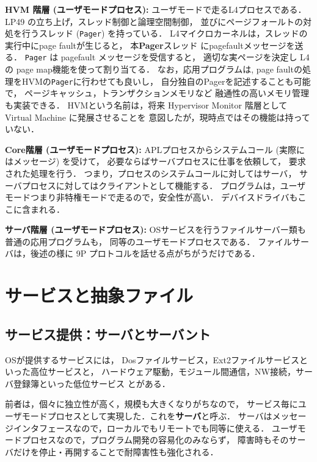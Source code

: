 \documentclass{ieicej}
\begin{document}
{\bf HVM 階層 (ユーザモードプロセス): }
     ユーザモードで走るL4プロセスである．
     LP49 の立ち上げ，スレッド制御と論理空間制御，
    並びにページフォールトの対処を行うスレッド ({\tt Pager}) を持っている．
%
    L4マイクロカーネルは，スレッドの実行中にpage faultが生じると，
    本{\bf Pager}スレッド にpagefaultメッセージを送る．
   {\tt Pager} は pagefault メッセージを受信すると，
   適切な実ページを決定し L4の page map機能を使って割り当てる．
   なお，応用プログラムは, page faultの処理をHVMの{\tt Pager}に行わせても良いし，
   自分独自のPagerを記述することも可能で，
   ページキャッシュ，トランザクションメモリなど
   融通性の高いメモリ管理も実装できる．
%
    HVMという名前は，将来 Hypervisor Monitor 階層として Virtual Machine に発展させることを
    意図したが，現時点ではその機能は持っていない．

    
{\bf Core階層  (ユーザモードプロセス): }
     APLプロセスからシステムコール (実際にはメッセージ) を受けて，
    必要ならばサーバプロセスに仕事を依頼して，
    要求された処理を行う．
   つまり，プロセスのシステムコールに対してはサーバ，
   サーバプロセスに対してはクライアントとして機能する．
%   
    プログラムは，ユーザモードつまり非特権モードで走るので，安全性が高い．
    デバイスドライバもここに含まれる．

    
{\bf サーバ階層 (ユーザモードプロセス): }
     OSサービスを行うファイルサーバー類も普通の応用プログラムも，
     同等のユーザモードプロセスである．
    ファイルサーバは，後述の様に 9P プロトコルを話せる点がちがうだけである． 

\section{サービスと抽象ファイル}

\subsection{サービス提供：サーバとサーバント}

  OSが提供するサービスには，
  Dosファイルサービス，Ext2ファイルサービスといった高位サービスと，
  ハードウェア駆動，モジュール間通信，NW接続，サーバ登録簿といった低位サービス
  とがある．

  前者は，個々に独立性が高く，規模も大きくなりがちなので，
  サービス毎にユーザモードプロセスとして実現した．これを{\bf サーバ}と呼ぶ．
  サーバはメッセージインタフェースなので，ローカルでもリモートでも同等に使える．
  ユーザモードプロセスなので，プログラム開発の容易化のみならず，
  障害時もそのサーバだけを停止・再開することで耐障害性も強化される．
\end{document}
